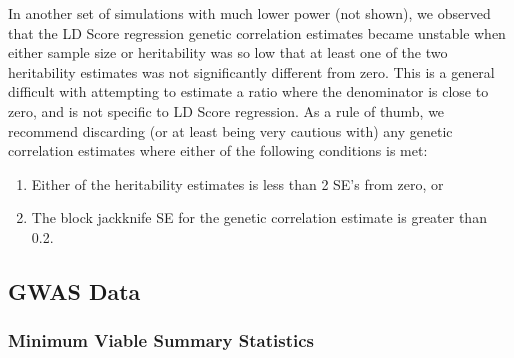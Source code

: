 \documentclass[11pt]{article}
\numberwithin{equation}{section}
\begin{document}
In another set of simulations with much lower power (not shown), we observed that the LD Score regression
genetic correlation estimates became unstable when either sample size or heritability was so low that at least one 
of the two heritability estimates was not significantly different from zero. 
This is a general difficult with attempting to estimate a ratio where the denominator is close to zero, and is not 
specific to LD Score regression. 
As a rule of thumb, 
we recommend discarding (or at least being very cautious with) 
any genetic correlation estimates where either of the following conditions is met:
\begin{enumerate}
	\item Either of the heritability estimates is less than 2 SE's from zero, or
	\item The block jackknife SE for the genetic correlation estimate is greater than 0.2.
\end{enumerate}


\subsection{GWAS Data}

\subsubsection{Minimum Viable Summary Statistics}
\end{document}
